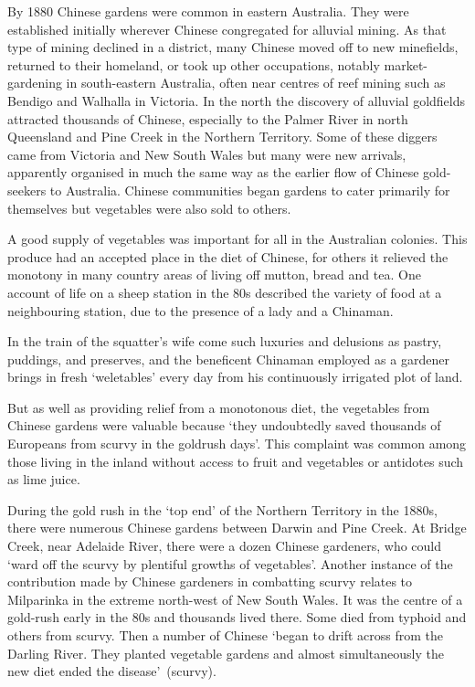 By 1880 Chinese gardens were common in eastern Australia.  They were
established initially wherever Chinese congregated for alluvial
mining.  As that type of mining declined in a
district, many Chinese moved off to new minefields, returned to their
homeland, or took up other occupations, notably market-gardening in
south-eastern Austra\-lia, often near centres of reef mining
 such as Bendigo  and Walhalla
 in Victoria.  In the north the discovery of
alluvial goldfields attracted thousands of Chinese, especially to the
Palmer River in  north Queensland
 and Pine Creek  in the Northern
Territory.   Some of these diggers came from
Victoria and New South Wales but many were new arrivals, apparently
organised in much the same way as the earlier flow of Chinese
gold-seekers to Australia.  Chinese communities began gardens to cater
primarily for themselves but vegetables were also sold to others.

A good supply of vegetables was important for all in the Australian
colonies.  This produce had an accepted place in the diet of Chinese,
for others it relieved the monotony in many country areas of living
off mutton, bread and tea.  One account of life on a sheep station in
the 80s described the variety of food at a neighbouring station, due
to the presence of a lady and a Chinaman.
\begin{Quote}
	In the train of the squatter's wife come such luxuries and
	delusions as pastry, puddings, and preserves, and the
	beneficent Chinaman employed as a gardener brings in fresh
	`weletables' every day from his continuously irrigated plot of
	land.
\end{Quote}
But as well as providing relief from a monotonous diet, the vegetables
from Chinese gardens were valuable because `they undoubtedly saved
thousands of Europeans from scurvy in the goldrush
days'.  This complaint was common among those
living in the inland without access to fruit and vegetables or
antidotes such as lime juice.

During the gold rush in the `top end' of the Northern Territory
 in the 1880s, there were numerous Chinese
 gardens between Darwin  and Pine
Creek.  At Bridge Creek,  near
Adelaide River,  there were a dozen Chinese
gardeners, who could `ward off the scurvy by plentiful growths of
vegetables'.  Another instance of the contribution made by Chinese
gardeners in combatting scurvy relates to
Milparinka  in the extreme north-west of New
South Wales.  It was the centre of a gold-rush early in the 80s and
thousands lived there.  Some died from typhoid
and others from scurvy.  Then a number of Chinese `began to drift
across from the Darling River. They planted vegetable gardens and
almost simultaneously the new diet ended the
disease'~(scurvy).

